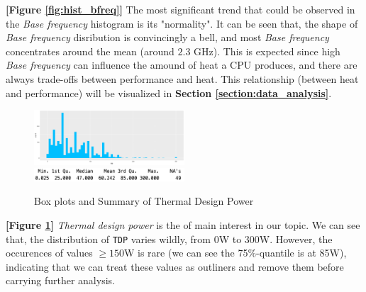 
\textbf{[Figure \ref{fig:hist_bfreq}]} The most significant trend that could be observed in the \textit{Base frequency} histogram is its "normality".
It can be seen that, the shape of \textit{Base frequency} disribution is convincingly a bell, and most \textit{Base frequency} concentrates around
the mean (around $2.3$ GHz). This is expected since high \textit{Base frequency} can influence the amound of heat a CPU produces, and there are always
trade-offs between performance and heat. This relationship (between heat and performance) will be visualized in \textbf{Section \ref{section:data_analysis}}.






\begin{figure}[H]
    \centering
    \includegraphics[width=0.5\textwidth]{./graphics/hist_tdp.pdf}
    \includegraphics[width=0.5\textwidth]{./graphics/sum_tdp.png}
    \caption{Box plots and Summary of Thermal Design Power}
    \label{fig:hist_tdp}
\end{figure}


\textbf{[Figure \ref{fig:hist_tdp}]} \textit{Thermal design power} is the of main interest in our topic. We can see that, the distribution of \verb|TDP| varies
wildly, from 0W to 300W. However, the occurences of values $\ge 150$W is rare (we can see the 75\%-quantile is at 85W), indicating that we can treat these values 
as outliners and remove them before carrying further analysis.